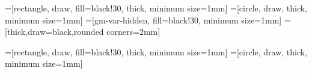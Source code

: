 \usepackage{amsfonts, amsmath, amssymb, amsthm}
\usepackage{hyperref, graphicx, verbatim, listings, multirow}
\usepackage{algorithm, algorithmic}


\usepackage{enumitem}

\usepackage{tikz}
\usetikzlibrary{arrows,decorations,fit,backgrounds}

=[rectangle, draw, fill=black!30, thick, minimum size=1mm]
=[circle, draw, thick, minimum size=1mm]
=[gm-var-hidden, fill=black!30, minimum size=1mm]
 = [thick,draw=black,rounded corners=2mm]

=[rectangle, draw, fill=black!30, thick, minimum size=1mm]
=[circle, draw, thick, minimum size=1mm]



\lstset{breaklines=true}

\setcounter{tocdepth}{3}

\makeatletter
\def\@xobeysp{ }
\makeatother

